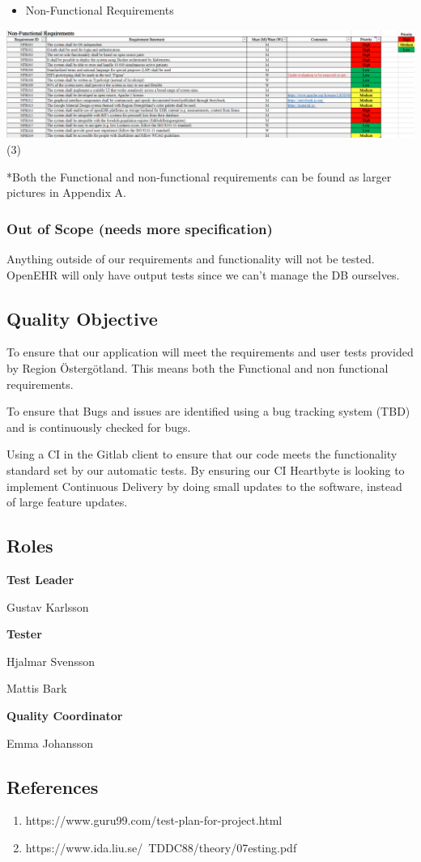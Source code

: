     \vfill
\clearpage
\begin{itemize}
    \item Non-Functional Requirements 
\end{itemize}
\includegraphics[width=\linewidth]{Pictures/Nonfunc.PNG} (3)

    \vfill
*Both the Functional and non-functional requirements can be found as larger pictures in Appendix A.
  
  


\subsubsection{Out of Scope (needs more specification)}
Anything outside of our requirements and functionality will not be tested. OpenEHR will only have output tests since we can't manage the DB ourselves.
\subsection{Quality Objective}
To ensure that our application will meet the requirements and user tests provided by Region Östergötland. This means both the Functional and non functional requirements. 

To ensure that Bugs and issues are identified using a bug tracking system (TBD) and is continuously checked for bugs.

Using a CI in the Gitlab client to ensure that our code meets the functionality standard set by our automatic tests. By ensuring our CI Heartbyte is looking to implement Continuous Delivery by doing small updates to the software, instead of large feature updates. 
\subsection{Roles}
\begin{flushleft}
   \textbf{Test Leader}
    
    
    Gustav Karlsson
  
   \textbf{Tester}
   
    Hjalmar Svensson
    
    Mattis Bark
   
   
   \textbf{Quality Coordinator}
   
    Emma Johansson
     

\end{flushleft}

\subsection{References}
\begin{enumerate}
  \item https://www.guru99.com/test-plan-for-project.html
  \item https://www.ida.liu.se/~TDDC88/theory/07esting.pdf
\end{enumerate}
